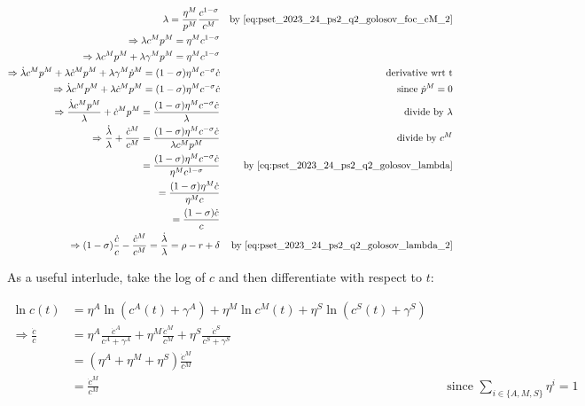 \begin{align}
    \lambda = \frac{\eta^M}{p^M} \frac{c^{1-\sigma}}{c^M} && \text{by \eqref{eq:pset_2023_24_ps2_q2_golosov_foc_cM_2}} \\
    \Rightarrow \lambda c^M p^M = \eta^M c^{1-\sigma} \label{eq:pset_2023_24_ps2_q2_golosov_lambda} \\
    \Rightarrow \lambda c^M p^M + \lambda \gamma^M p^M = \eta^M c^{1-\sigma} \\
    \Rightarrow \dot{\lambda} c^M p^M + \lambda \dot{c}^M p^M + \lambda \gamma^M \dot{p}^M = (1-\sigma) \eta^M c^{-\sigma} \dot{c} && \text{derivative wrt t} \\
    \Rightarrow \dot{\lambda} c^M p^M + \lambda \dot{c}^M p^M = (1-\sigma) \eta^M c^{-\sigma} \dot{c} && \text{since $\dot{p}^M = 0$} \\
    \Rightarrow \frac{\dot{\lambda}c^M p^M}{\lambda} + \dot{c}^M p^M = \frac{(1-\sigma) \eta^M c^{-\sigma} \dot{c}}{\lambda} && \text{divide by $\lambda$} \\
    \Rightarrow \frac{\dot{\lambda}}{\lambda} + \frac{\dot{c}^M}{c^M} = \frac{(1-\sigma) \eta^M c^{-\sigma} \dot{c}}{\lambda c^M p^M} && \text{divide by $c^M$} \\
    = \frac{(1-\sigma) \eta^M c^{-\sigma} \dot{c}}{\eta^M c^{1-\sigma}} && \text{by \eqref{eq:pset_2023_24_ps2_q2_golosov_lambda}} \\
    = \frac{(1-\sigma) \eta^M \dot{c}}{\eta^M c} \\
    = \frac{(1-\sigma) \dot{c}}{c} \\
    \Rightarrow (1-\sigma) \frac{\dot{c}}{c}-\frac{\dot{c}^M}{c^M}= \frac{\dot{\lambda}}{\lambda} = \rho - r +\delta && \text{by \eqref{eq:pset_2023_24_ps2_q2_golosov_lambda_2}} \label{eq:pset_2023_24_ps2_q2_golosov_lambda_3}
\end{align}


As a useful interlude, take the log of $c$ and then differentiate with respect to $t$:

\begin{align}
    \ln c(t) &= \eta^A \ln (c^A(t)+\gamma^A) + \eta^M \ln c^M(t) + \eta^S \ln (c^S(t)+\gamma^S) \\
    \Rightarrow \frac{\dot{c}}{c} &= \eta^A \frac{\dot{c}^A}{c^A+\gamma^A} + \eta^M \frac{\dot{c}^M}{c^M} + \eta^S \frac{\dot{c}^S}{c^S+\gamma^S} \\
    &= (\eta^A + \eta^M + \eta^S) \frac{\dot{c}^M}{c^M} \\
    &= \frac{\dot{c}^M}{c^M} && \text{since } \sum_{i \in\{A, M, S\}} \eta^i=1
\end{align}

